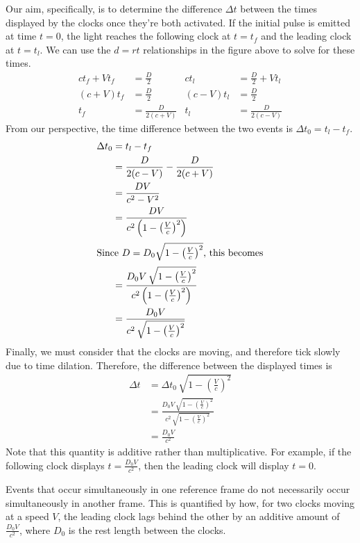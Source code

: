 \documentclass[../p023main.tex]{subfiles}
\begin{document}
Our aim, specifically, is to determine the difference $\Delta t$ between the times displayed by the clocks once they're both activated.
If the initial pulse is emitted at time $t = 0$, the light reaches the following clock at $t = t_f$ and the leading clock at $t = t_l$.
We can use the $d = rt$ relationships in the figure above to solve for these times.
\begin{align*}
    ct_f + Vt_f &= \frac{D}{2} & ct_l &= \frac{D}{2} + Vt_l \\
    (c + V)t_f &= \frac{D}{2} & (c - V)t_l &= \frac{D}{2} \\
    t_f &= \frac{D}{2(c + V)} & t_l &= \frac{D}{2(c - V)}
\end{align*}
From our perspective, the time difference between the two events is $\Delta t_0 = t_l - t_f$.
\begin{align*}
    \Delta t_0 &= t_l - t_f \\
    &= \frac{D}{2 (c - V)} - \frac{D}{2 (c + V)} \\
    &= \frac{DV}{c^2 - V^2} \\
    &= \frac{DV}{c^2 \left( 1 - \left( \frac{V}{c} \right)^2  \right)} \\
    \intertext{Since $D = D_0\sqrt{1 - \left( \frac{V}{c} \right)^2}$, this becomes}
    &= \frac{D_0 V \, \sqrt{ 1 - \left( \frac{V}{c} \right)^2 }}{c^2 \left( 1 - \left( \frac{V}{c} \right)^2  \right)} \\
    &= \frac{D_0 V}{c^2 \,\sqrt{ 1 - \left( \frac{V}{c} \right)^2 }}
\end{align*}
Finally, we must consider that the clocks are moving, and therefore tick slowly due to time dilation.
Therefore, the difference between the displayed times is
\begin{align}
    \Delta t &= \Delta t_0 \, \sqrt{ 1 - \left( \frac{V}{c} \right)^2} \\
    &= \frac{D_0 V \, \sqrt{ 1 - \left( \frac{V}{c} \right)^2}}{c^2 \, \sqrt{ 1 - \left( \frac{V}{c} \right)^2}} \\
    &= \frac{D_0 V}{c^2}
\end{align}
Note that this quantity is additive rather than multiplicative.
For example, if the following clock displays $t = \frac{D_0V}{c^2}$, then the leading clock will display $t = 0$.

\begin{summary}
    Events that occur simultaneously in one reference frame do not necessarily occur simultaneously in another frame.
    This is quantified by how, for two clocks moving at a speed $V$, the leading clock lags behind the other by an additive amount of $\frac{D_0V}{c^2}$, where $D_0$ is the rest length between the clocks.
\end{summary}
\end{document}
